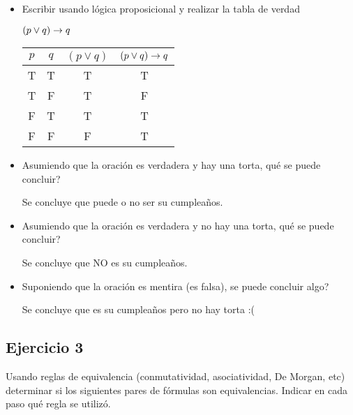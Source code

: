 \begin{itemize}
      \item Escribir usando lógica proposicional y realizar la tabla de verdad

            $(p \lor q) \rightarrow q$

            \begin{tabular}{|c|c|c|c|}
                  \hline
                  $p$ & $q$ & $(p \lor q)$ & $(p \lor q) \rightarrow q$ \\
                  \hline
                  T   & T   & T            & T                    \\
                  \hline
                  T   & F   & T            & F                    \\
                  \hline
                  F   & T   & T            & T                    \\
                  \hline
                  F   & F   & F            & T                    \\
                  \hline
            \end{tabular}

      \item Asumiendo que la oración es verdadera y hay una torta, qué se puede concluir?

            Se concluye que puede o no ser su cumpleaños.

      \item Asumiendo que la oración es verdadera y no hay una torta, qué se puede concluir?

            Se concluye que NO es su cumpleaños.

      \item Suponiendo que la oración es mentira (es falsa), se puede concluir algo?

            Se concluye que es su cumpleaños pero no hay torta :(
\end{itemize}

\subsection{Ejercicio 3}
Usando reglas de equivalencia (conmutatividad, asociatividad, De Morgan, etc) determinar si los siguientes pares de fórmulas son equivalencias. Indicar en cada paso qué regla se utilizó.

